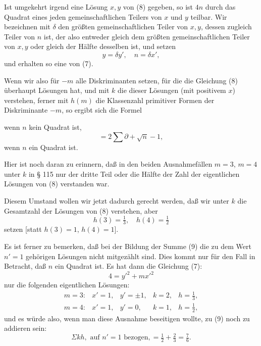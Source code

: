 Ist umgekehrt irgend eine Lösung $x, y$ von (8) gegeben, so ist $4n$
durch das Quadrat eines jeden gemeinschaftlichen Teilers von $x$ und $y$
teilbar. Wir bezeichnen mit $\delta$ den größten gemeinschaftlichen
Teiler von $x, y$, dessen  zugleich Teiler von $n$ ist, der also
entweder gleich dem größten gemeinschaftlichen Teiler von $x, y$ oder
gleich der Hälfte desselben ist, und setzen
\[
y = \delta y', \quad n = \delta x', %
\]
und erhalten so eine  von (7).

Wenn wir also für $-m$ alle Diskriminanten setzen, für die die Gleichung
(8) überhaupt Lösungen hat, und mit $k$ die  dieser Lösungen (mit
positivem $x$) verstehen, ferner mit $h(m)$ die Klassenzahl primitiver
Formen der Diskriminante $-m$, so ergibt sich die Formel

wenn $n$ kein Quadrat ist,
\[
= 2\sum \partial + \sqrt{n} - 1,
\]
wenn $n$ ein Quadrat ist.

Hier ist noch daran zu erinnern, daß in den beiden Ausnahmefällen $m=3$,
$m=4$ unter $k$ in § 115 nur der dritte Teil oder die Hälfte der Zahl
der eigentlichen Lösungen von (8) verstanden war.

Diesem Umstand wollen wir jetzt dadurch gerecht werden, daß wir unter
$k$ die Gesamtzahl der Lösungen von (8) verstehen, aber
\[
h(3) = \tfrac{1}{3}, \quad h(4) = \tfrac{1}{2}
\]
setzen [statt $h(3)=1$, $h(4)=1$].

Es ist ferner zu bemerken, daß bei der Bildung der Summe (9) die zu dem
Wert $n'=1$ gehörigen Lösungen nicht mitgezählt sind. Dies kommt nur für
den Fall in Betracht, daß $n$ ein Quadrat ist. Es hat dann die Gleichung
(7):
\[
4 = y'^2 + m x'^2
\]
nur die folgenden eigentlichen Lösungen:
\[
\begin{array}{lllll}
m=3: & x'=1, & y'=\pm 1, & k=2, & h=\tfrac{1}{3},\\
m=4: & x'=1, & y'=0, & k=1, & h=\tfrac{1}{2},
\end{array}
\]
und es würde also, wenn man diese Ausnahme beseitigen wollte, zu (9)
noch zu addieren sein:
\[
\Sigma k h, \text{ auf } n'=1 \text{ bezogen}, = \tfrac{1}{2}+\tfrac{2}{3} = \tfrac{7}{6}.
\]
